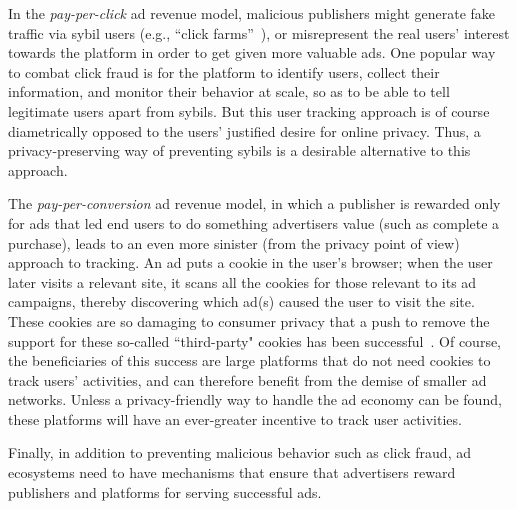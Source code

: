 %
%
%
In the \emph{pay-per-click} ad revenue model, malicious publishers might generate fake traffic via sybil users (e.g., ``click
farms''~\cite{understanding-ad-fraud}), or misrepresent the real users' interest
towards the platform in order to get given more valuable ads.
%
One popular way to combat click fraud is for the platform to identify users,
collect their information, and monitor their behavior at scale, so as to be able to tell legitimate users apart from sybils.
%
But this user tracking approach is of course diametrically opposed to the users' justified desire for online
privacy.
%
Thus, a privacy-preserving way of preventing sybils is a desirable alternative to this approach.
%

%
The \emph{pay-per-conversion} ad revenue model, in which a publisher is rewarded only for ads that led end users to do something advertisers value (such as complete a purchase), leads to an even more sinister (from the privacy point of view) approach to tracking.
%
An ad puts a cookie in the user's browser; when the user later visits a relevant site, it scans all the cookies for those relevant to its ad campaigns, thereby discovering which ad(s) caused the user to visit the site.
%
These cookies are so damaging to consumer privacy that a push to remove the support for these so-called ``third-party" cookies has been successful~\cite{consumerreports-3rd-party-cookies}.
%
Of course, the beneficiaries of this success are large platforms that do not need cookies to track users' activities, and can therefore benefit from the demise of smaller ad networks.
%
Unless a privacy-friendly way to handle the ad economy can be found, these platforms will have an ever-greater incentive to track user activities.
%

%
Finally, in addition to preventing malicious behavior such as click fraud, ad ecosystems need to have mechanisms that ensure that advertisers reward publishers and platforms for serving successful ads.  
%

